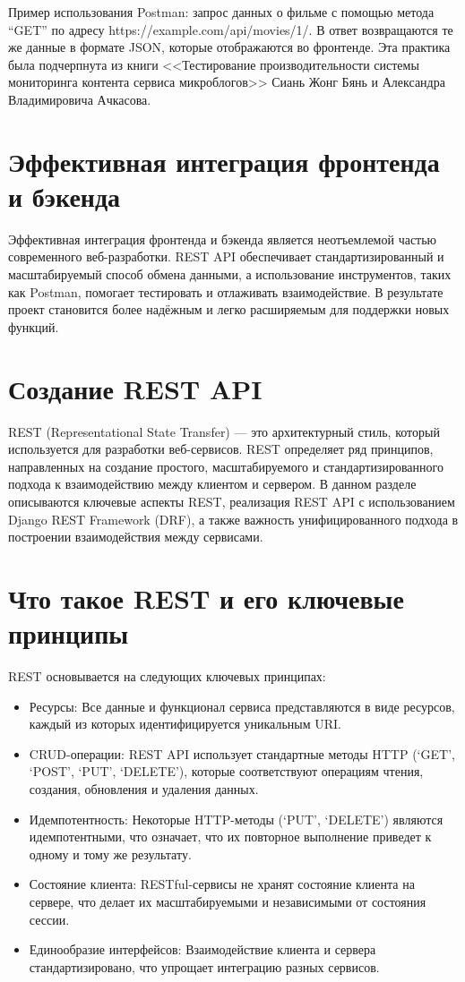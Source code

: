 Пример использования Postman: запрос данных о фильме с помощью метода ``GET'' по адресу https://example.com/api/movies/1/. В ответ возвращаются те же данные в формате JSON, которые отображаются во фронтенде.
Эта практика была подчерпнута из книги <<Тестирование производительности системы мониторинга контента сервиса микроблогов>> Сиань Жонг Бянь и Александра Владимировича Ачкасова\cite{бянь2023тестирование}.

\section{Эффективная интеграция фронтенда и бэкенда}
Эффективная интеграция фронтенда и бэкенда является неотъемлемой частью современного веб-разработки. REST API обеспечивает стандартизированный и масштабируемый способ обмена данными, а использование инструментов, таких как Postman, помогает тестировать и отлаживать взаимодействие. В результате проект становится более надёжным и легко расширяемым для поддержки новых функций.

\section{Создание REST API}
REST (Representational State Transfer) — это архитектурный стиль, который используется для разработки веб-сервисов. REST определяет ряд принципов, направленных на создание простого, масштабируемого и стандартизированного подхода к взаимодействию между клиентом и сервером. В данном разделе описываются ключевые аспекты REST, реализация REST API с использованием Django REST Framework (DRF), а также важность унифицированного подхода в построении взаимодействия между сервисами.

\section{Что такое REST и его ключевые принципы}
REST основывается на следующих ключевых принципах:
\begin{itemize}
    \item Ресурсы: Все данные и функционал сервиса представляются в виде ресурсов, каждый из которых идентифицируется уникальным URI.
    \item CRUD-операции: REST API использует стандартные методы HTTP (‘GET’, ‘POST’, ‘PUT’, ‘DELETE’), которые соответствуют операциям чтения, создания, обновления и удаления данных.
    \item Идемпотентность: Некоторые HTTP-методы (‘PUT’, ‘DELETE’) являются идемпотентными, что означает, что их повторное выполнение приведет к одному и тому же результату.
    \item Состояние клиента: RESTful-сервисы не хранят состояние клиента на сервере, что делает их масштабируемыми и независимыми от состояния сессии.
    \item Единообразие интерфейсов: Взаимодействие клиента и сервера стандартизировано, что упрощает интеграцию разных сервисов.
\end{itemize}

